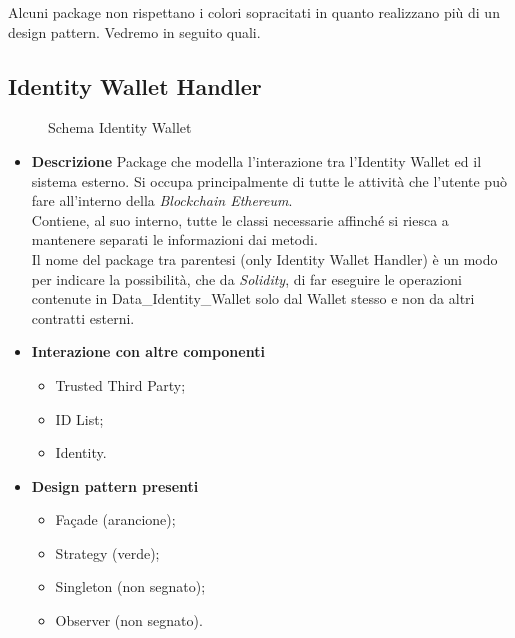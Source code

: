 Alcuni package non rispettano i colori sopracitati in quanto realizzano più di un design pattern. Vedremo in seguito quali.
\subsection{Identity Wallet Handler}
\begin{figure}[!h]
	\centering
	\caption{Schema Identity Wallet}
\end{figure}
\begin{itemize}
	\item \textbf{Descrizione}
	Package che modella l'interazione tra l'Identity Wallet ed il sistema esterno. Si occupa principalmente di tutte le attività che l'utente può fare all'interno della \textit{Blockchain Ethereum}.\\
	Contiene, al suo interno, tutte le classi necessarie affinché si riesca a mantenere separati le informazioni dai metodi.\\
	Il nome del package tra parentesi (only Identity Wallet Handler) è un modo per indicare la possibilità, che da \textit{Solidity}, di far eseguire le operazioni contenute in Data\_Identity\_Wallet solo dal Wallet stesso e non da altri contratti esterni.
	\item \textbf{Interazione con altre componenti}
	\begin{itemize}
		\item Trusted Third Party;
		\item ID List;
		\item Identity.
	\end{itemize}
	\item \textbf{Design pattern presenti}
	\begin{itemize}
		\item Façade (arancione);
		\item Strategy (verde);
		\item Singleton (non segnato);
		\item Observer (non segnato).
	\end{itemize}
\end{itemize}
